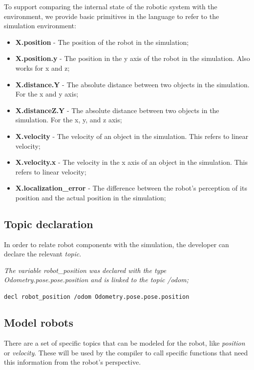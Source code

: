 \documentclass[runningheads]{llncs}
\begin{document}
To support comparing the internal state of the robotic system with the environment, we provide basic primitives in the language to refer to the simulation environment:

\begin{itemize}
\item {\bfseries X.position} - The position of the robot in the simulation;
\item {\bfseries X.position.y} - The position in the y axis of the robot in the simulation. Also works for x and z;
\item {\bfseries X.distance.Y} - The absolute distance between two objects in the simulation. For the x and y axis;
\item {\bfseries X.distanceZ.Y} - The absolute distance between two objects in the simulation. For the x, y, and z axis;
\item {\bfseries X.velocity} - The velocity of an object in the simulation. This refers to linear velocity;
\item {\bfseries X.velocity.x} - The velocity in the x axis of an object in the simulation. This refers to linear velocity;
\item {\bfseries X.localization\_error} - The difference between the robot's perception of its position and the actual position in the simulation;
\end{itemize}


\subsection{Topic declaration}

In order to relate robot components with the simulation, the developer can declare the relevant \textit{topic}.

\textit{The variable robot\_position was declared with the type Odometry.pose.pose.position and is linked to the topic /odom;}

\vspace{3mm}

\texttt{decl robot\_position /odom Odometry.pose.pose.position}


\subsection{Model robots}

There are a set of specific topics that can be modeled for the robot, like \textit{position} or \textit{velocity}. These will be used by the compiler to call specific functions that need this information from the robot's perspective.
\end{document}
